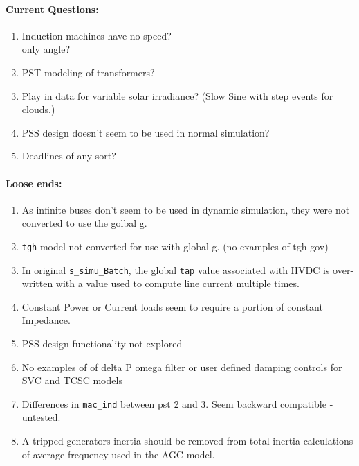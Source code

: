 \documentclass[12pt]{article}
\begin{document}
\begin{multicols}{2}
\begin{enumerate}
	\end{enumerate}



\paragraph{Current Questions:}
	\begin{enumerate}
	\itemsep0em 
	
	
	\item Induction machines have no speed?\\ only angle?
	\item PST modeling of transformers?
	\item Play in data for variable solar irradiance? (Slow Sine with step events for clouds.)
	\item PSS design doesn't seem to be used in normal simulation?
	\item Deadlines of any sort?
	
	\end{enumerate}	

\paragraph{Loose ends:} %
	\begin{enumerate}
	\item As infinite buses don't seem to be used in dynamic simulation, they were not converted to use the golbal g.
		\item \verb|tgh| model not converted for use with global g. (no examples of tgh gov)
		\item In original \verb|s_simu_Batch|, the global \verb|tap| value associated with HVDC is over-written with  a value used to compute line current multiple times.
		\item Constant Power or Current loads seem to require a portion of constant Impedance.
		\item PSS design functionality not explored
		\item No examples of of delta P omega filter or user defined damping controls for SVC and TCSC models
		\item Differences in \verb|mac_ind| between pst 2 and 3. Seem backward compatible - untested.
		\item A tripped generators inertia should be removed from total inertia calculations of average frequency used in the AGC model.
	\end{enumerate}
\vfill\null

\end{multicols}
\end{document}
